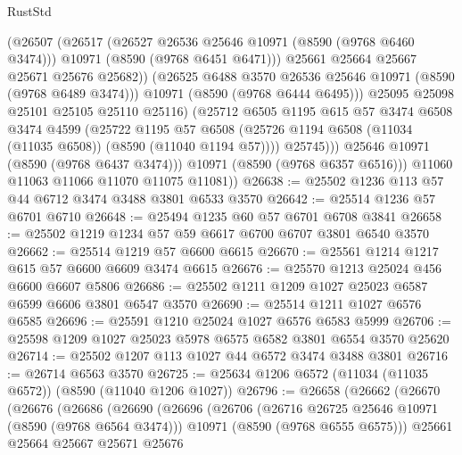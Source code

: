 \begin{lexlean}{RustStd}
\begin{coremodule}
                      (@26507
                        (@26517
                          (@26527 @26536 @25646 @10971 (@8590 (@9768 @6460 @3474)))
                          @10971
                          (@8590 (@9768 @6451 @6471)))
                        @25661
                        @25664
                        @25667
                        @25671
                        @25676
                        @25682))
                    (@26525 @6488 @3570 @26536 @25646 @10971 (@8590 (@9768 @6489 @3474)))
                    @10971
                    (@8590 (@9768 @6444 @6495)))
                  @25095
                  @25098
                  @25101
                  @25105
                  @25110
                  @25116)
                (@25712
                  @6505
                  @1195
                  @615
                  @57
                  @3474
                  @6508
                  @3474
                  @4599
                  (@25722
                    @1195
                    @57
                    @6508
                    (@25726 @1194 @6508 (@11034 (@11035 @6508)) (@8590 (@11040 @1194 @57))))
                  @25745)))
            @25646
            @10971
            (@8590 (@9768 @6437 @3474)))
          @10971
          (@8590 (@9768 @6357 @6516)))
        @11060
        @11063
        @11066
        @11070
        @11075
        @11081))
@26638 := @25502 @1236 @113 @57 @44 @6712 @3474 @3488 @3801 @6533 @3570
@26642 := @25514 @1236 @57 @6701 @6710
@26648 := @25494 @1235 @60 @57 @6701 @6708 @3841
@26658 := @25502 @1219 @1234 @57 @59 @6617 @6700 @6707 @3801 @6540 @3570
@26662 := @25514 @1219 @57 @6600 @6615
@26670 := @25561 @1214 @1217 @615 @57 @6600 @6609 @3474 @6615
@26676 := @25570 @1213 @25024 @456 @6600 @6607 @5806
@26686 := @25502 @1211 @1209 @1027 @25023 @6587 @6599 @6606 @3801 @6547 @3570
@26690 := @25514 @1211 @1027 @6576 @6585
@26696 := @25591 @1210 @25024 @1027 @6576 @6583 @5999
@26706 := @25598 @1209 @1027 @25023 @5978 @6575 @6582 @3801 @6554 @3570 @25620
@26714 := @25502 @1207 @113 @1027 @44 @6572 @3474 @3488 @3801
@26716 := @26714 @6563 @3570
@26725 := @25634 @1206 @6572 (@11034 (@11035 @6572)) (@8590 (@11040 @1206 @1027))
@26796 := @26658
    (@26662
      (@26670
        (@26676
          (@26686
            (@26690
              (@26696
                (@26706
                  (@26716 @26725 @25646 @10971 (@8590 (@9768 @6564 @3474)))
                  @10971
                  (@8590 (@9768 @6555 @6575)))
                @25661
                @25664
                @25667
                @25671
                @25676

\end{coremodule}
\end{lexlean}
